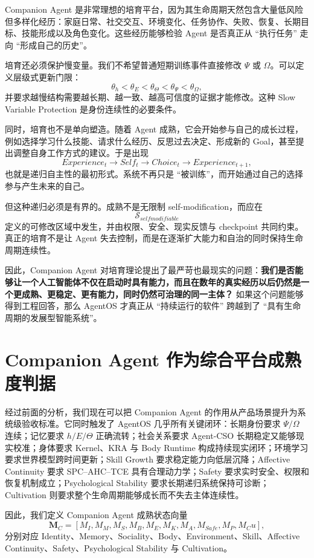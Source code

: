 Companion Agent 是非常理想的培育平台，因为其生命周期天然包含大量低风险但多样化经历：家庭日常、社交交互、环境变化、任务协作、失败、恢复、长期目标、技能形成以及角色变化。这些经历能够检验 Agent 是否真正从 ``执行任务'' 走向 ``形成自己的历史''。

培育还必须保护慢变量。我们不希望普通短期训练事件直接修改 $\Psi$ 或 $\Omega$。可以定义层级式更新门限：
\[
\theta_h
<
\theta_E
<
\theta_{\Theta}
<
\theta_{\Psi}
<
\theta_{\Omega},
\]
并要求越慢结构需要越长期、越一致、越高可信度的证据才能修改。这种 Slow Variable Protection 是身份连续性的必要条件。

同时，培育也不是单向塑造。随着 Agent 成熟，它会开始参与自己的成长过程，例如选择学习什么技能、请求什么经历、反思过去决定、形成新的 Goal，甚至提出调整自身工作方式的建议。于是出现
\[
Experience_t
\rightarrow
Self_t
\rightarrow
Choice_t
\rightarrow
Experience_{t+1},
\]
也就是递归自主性的最初形式。系统不再只是 ``被训练''，而开始通过自己的选择参与产生未来的自己。

但这种递归必须是有界的。成熟不是无限制 self-modification，而应在
\[
\mathcal S_{selfmodifiable}
\]
定义的可修改区域中发生，并由权限、安全、现实反馈与 checkpoint 共同约束。真正的培育不是让 Agent 失去控制，而是在逐渐扩大能力和自治的同时保持生命周期连续性。

因此，Companion Agent 对培育理论提出了最严苛也最现实的问题：\textbf{我们是否能够让一个人工智能体不仅在启动时具有能力，而且在数年的真实经历以后仍然是一个更成熟、更稳定、更有能力，同时仍然可治理的同一主体？} 如果这个问题能够得到工程回答，那么 AgentOS 才真正从 ``持续运行的软件'' 跨越到了 ``具有生命周期的发展型智能系统''。

\section{Companion Agent 作为综合平台成熟度判据}

经过前面的分析，我们现在可以把 Companion Agent 的作用从产品场景提升为系统级验收标准。它同时触发了 AgentOS 几乎所有关键闭环：长期身份要求 $\Psi/\Omega$ 连续；记忆要求 $h/E/\Theta$ 正确流转；社会关系要求 Agent-CSO 长期稳定又能够现实校准；身体要求 Kernel、KRA 与 Body Runtime 构成持续现实闭环；环境学习要求世界模型跨时间更新；Skill Growth 要求稳定能力向低层沉降；Affective Continuity 要求 SPC--AHC--TCE 具有合理动力学；Safety 要求实时安全、权限和恢复机制成立；Psychological Stability 要求长期递归系统保持可诊断；Cultivation 则要求整个生命周期能够成长而不失去主体连续性。

因此，我们定义 Companion Agent 成熟状态向量
\[
\mathbf M_C
=
[
M_I,
M_M,
M_S,
M_B,
M_E,
M_K,
M_A,
M_{Safe},
M_P,
M_Cu
],
\]
分别对应 Identity、Memory、Sociality、Body、Environment、Skill、Affective Continuity、Safety、Psychological Stability 与 Cultivation。

